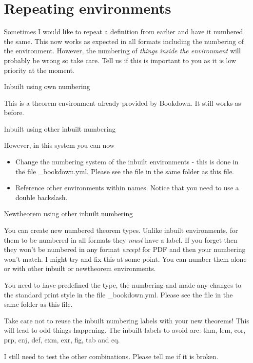\documentclass[
  10pt,
  english,
  a4paper]{article}
\providecommand{\tightlist}{%
  \setlength{\itemsep}{0pt}\setlength{\parskip}{0pt}}
\theoremstyle{plain}
\theoremstyle{definition}
\theoremstyle{plain}
\theoremstyle{plain}
\theoremstyle{plain}
\theoremstyle{plain}
\theoremstyle{plain}
\theoremstyle{definition}
\theoremstyle{definition}
\theoremstyle{remark}
\theoremstyle{remark}
\let\BeginKnitrBlock\begin \let\EndKnitrBlock\end
\begin{document}
\hypertarget{repeating-environments}{%
\section{Repeating environments}\label{repeating-environments}}

Sometimes I would like to repeat a definition from earlier and have it numbered the same. This now works as expected in all formats including the numbering of the environment. However, the numbering of \emph{things inside the environment} will probably be wrong so take care. Tell us if this is important to you as it is low priority at the moment.

Inbuilt using own numbering
\begingroup\renewcommand{\thetheorem}{\ref{thm:thm1}}
\BeginKnitrBlock{theorem}[Foo]
{ \iffalse (Foo) \fi{} }
This is a theorem environment already provided by Bookdown. It still works as before.
\EndKnitrBlock{theorem}
\endgroup\addtocounter{theorem}{-1}
Inbuilt using other inbuilt numbering
\begingroup\renewcommand{\thetheorem}{\ref{prp:prp1}}
\BeginKnitrBlock{proposition}[Thingy we need for \ref{thm:thm1}]
{ \iffalse (Thingy we need for \ref{thm:thm1}) \fi{} }
However, in this system you can now

\begin{itemize}
\tightlist
\item
  Change the numbering system of the inbuilt environments - this is done in the file \_bookdown.yml. Please see the file in the same folder as this file.
\item
  Reference other environments within names. Notice that you need to use a double backslash.
\end{itemize}
\EndKnitrBlock{proposition}
\endgroup\addtocounter{theorem}{-1}
Newtheorem using other inbuilt numbering
\begingroup\renewcommand{\thedefinition}{\ref{Def:def1}}
\BeginKnitrBlock{Definitions}
{}
You can create new numbered theorem types. Unlike inbuilt environments, for them to be numbered in all formats they \emph{must} have a label. If you forget then they won't be numbered in any format \emph{except} for PDF and then your numbering won't match. I might try and fix this at some point. You can number them alone or with other inbuilt or newtheorem environments.

You need to have predefined the type, the numbering and made any changes to the standard print style in the file \_bookdown.yml. Please see the file in the same folder as this file.

Take care not to reuse the inbuilt numbering labels with your new theorems! This will lead to odd things happening. The inbuilt labels to avoid are: thm, lem, cor, prp, cnj, def, exm, exr, fig, tab and eq.
\EndKnitrBlock{Definitions}
\endgroup\addtocounter{definition}{-1}
I still need to test the other combinations. Please tell me if it is broken.
\end{document}

